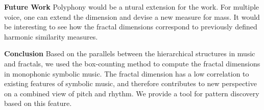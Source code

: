 

\textbf{Future Work}
Polyphony would be a ntural extension for the work. 
For multiple voice, one can extend the dimension and devise a new measure for mass. 
It would be interesting to see how the fractal dimensions correspond to previously defined harmonic similarity measures. 

\textbf{Conclusion}
Based on the parallels between the hierarchical structures in music and fractals, we used the box-counting method to compute the fractal dimensions in monophonic symbolic music.
The fractal dimension has a low correlation to existing features of symbolic music, and therefore contributes to new perspective on a combined view of pitch and rhythm.
We provide a tool for pattern discovery based on this feature. 


